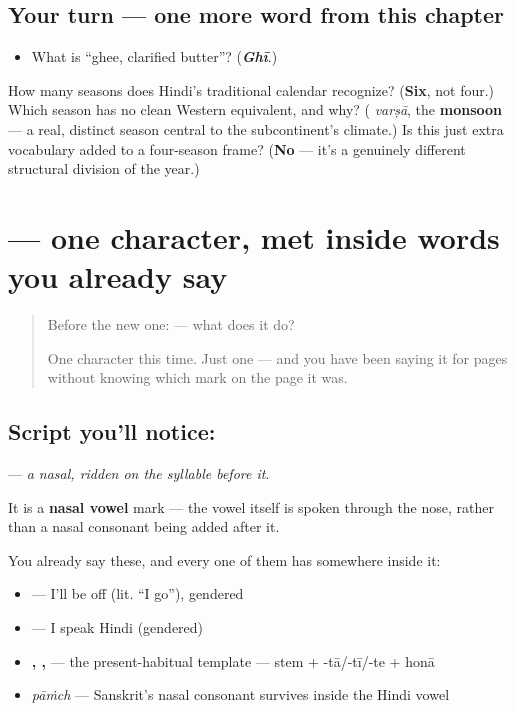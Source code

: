 \subsection*{Your turn — one more word from this chapter}
\begin{itemize}
\raggedright
  \item What is \textquotedblleft{}ghee, clarified butter\textquotedblright{}? (\emph{\textbf{Ghī}}.)
\end{itemize}

\begin{tcolorbox}[breakable,colback=teal!4,colframe=teal!35!black,title={Before you move on}]
How many seasons does Hindi's traditional  calendar recognize? (\textbf{Six}, not four.) Which season has no clean Western equivalent, and why? (\textbf{} \emph{varṣā}, the \textbf{monsoon} — a real, distinct season central to the subcontinent's climate.) Is this just extra vocabulary added to a four-season frame? (\textbf{No} — it's a genuinely different structural division of the year.)
\end{tcolorbox}
\section[\texorpdfstring{\hi{ँ} (candrabindu)}{ँ (candrabindu)}]{ — one character, met inside words you already say}

\label{lesson:HI-S118-sign-candrabindu}



\begin{quote}
Before the new one:  — what does it do?

One character this time. Just one — and you have been saying it for pages without knowing which mark on the page it was.
\end{quote}

\subsection*{Script you'll notice: }
\textbf{} — \emph{a nasal, ridden on the syllable before it}.

It is a \textbf{nasal vowel} mark — the vowel itself is spoken through the nose, rather than a nasal consonant being added after it.

You already say these, and every one of them has  somewhere inside it:

\begin{itemize}
\raggedright
  \item \textbf{ } — I'll be off (lit. \textquotedblleft{}I go\textquotedblright{}), gendered
  \item \textbf{   } — I speak Hindi (gendered)
  \item \textbf{ ,  ,  } — the present-habitual template — stem + -tā/-tī/-te + honā
  \item \textbf{} \emph{pāṁch} — Sanskrit's nasal consonant survives inside the Hindi vowel
\end{itemize}

